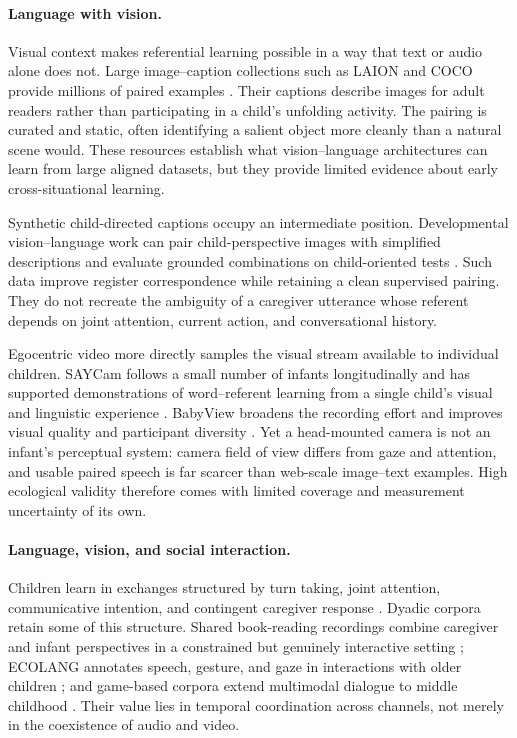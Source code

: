 \paragraph{Language with vision.}
Visual context makes referential learning possible in a way that text or audio alone does not. Large image--caption collections such as LAION and COCO provide millions of paired examples \citep{schuhmann2022laion,lin2014microsoft}. Their captions describe images for adult readers rather than participating in a child's unfolding activity. The pairing is curated and static, often identifying a salient object more cleanly than a natural scene would. These resources establish what vision--language architectures can learn from large aligned datasets, but they provide limited evidence about early cross-situational learning.

Synthetic child-directed captions occupy an intermediate position. Developmental vision--language work can pair child-perspective images with simplified descriptions and evaluate grounded combinations on child-oriented tests \citep{Wang2025}. Such data improve register correspondence while retaining a clean supervised pairing. They do not recreate the ambiguity of a caregiver utterance whose referent depends on joint attention, current action, and conversational history.

Egocentric video more directly samples the visual stream available to individual children. SAYCam follows a small number of infants longitudinally and has supported demonstrations of word--referent learning from a single child's visual and linguistic experience \citep{sullivan2021saycam,Vong2024}. BabyView broadens the recording effort and improves visual quality and participant diversity \citep{Long2024}. Yet a head-mounted camera is not an infant's perceptual system: camera field of view differs from gaze and attention, and usable paired speech is far scarcer than web-scale image--text examples. High ecological validity therefore comes with limited coverage and measurement uncertainty of its own.

\paragraph{Language, vision, and social interaction.}
Children learn in exchanges structured by turn taking, joint attention, communicative intention, and contingent caregiver response \citep{Tomasello1995,Csibra2009}. Dyadic corpora retain some of this structure. Shared book-reading recordings combine caregiver and infant perspectives in a constrained but genuinely interactive setting \citep{ahamat2025shared}; ECOLANG annotates speech, gesture, and gaze in interactions with older children \citep{gu2025ecolang}; and game-based corpora extend multimodal dialogue to middle childhood \citep{bodur2021chico,goumri2024chica}. Their value lies in temporal coordination across channels, not merely in the coexistence of audio and video.

